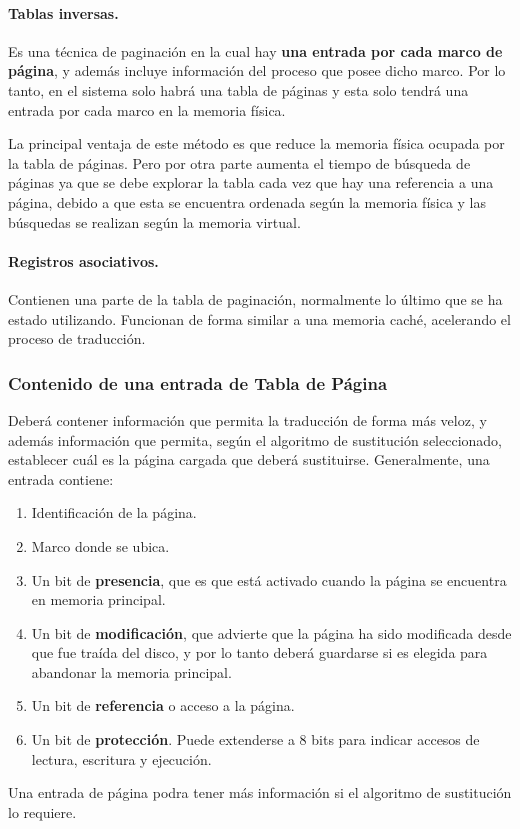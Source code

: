\documentclass[10pt,a4paper]{article}
\begin{document}
\paragraph{Tablas inversas.} Es una técnica de paginación en la cual hay \textbf{una entrada por cada marco de página}, y además incluye información del proceso que posee dicho marco. Por lo tanto, en el sistema solo habrá una tabla de páginas y esta solo tendrá una entrada por cada marco en la memoria física. 

La principal ventaja de este método es que reduce la memoria física ocupada por la tabla de páginas. Pero por otra parte aumenta el tiempo de búsqueda de páginas ya que se debe explorar la tabla cada vez que hay una referencia a una página, debido a que esta se encuentra ordenada según la memoria física y las búsquedas se realizan según la memoria virtual.

\paragraph{Registros asociativos.} Contienen una parte de la tabla de paginación, normalmente lo último que se ha estado utilizando. Funcionan de forma similar a una memoria caché, acelerando el proceso de traducción.

\subsubsection{Contenido de una entrada de Tabla de Página}
Deberá contener información que permita la traducción de forma más veloz, y además información que permita, según el algoritmo de sustitución seleccionado, establecer cuál es la página cargada que deberá sustituirse. Generalmente, una entrada contiene:
\begin{enumerate}
\item Identificación de la página.
\item Marco donde se ubica.
\item Un bit de \textbf{presencia}, que es que está activado cuando la página se encuentra en memoria principal. 
\item Un bit de \textbf{modificación}, que advierte que la página ha sido modificada desde que fue traída del disco, y por lo tanto deberá guardarse si es elegida para abandonar la memoria principal.
\item Un bit de \textbf{referencia} o acceso a la página.
\item Un bit de \textbf{protección}. Puede extenderse a 8 bits para indicar accesos de lectura, escritura y ejecución.
\end{enumerate}
Una entrada de página podra tener más información si el algoritmo de sustitución lo requiere.
\end{document}

